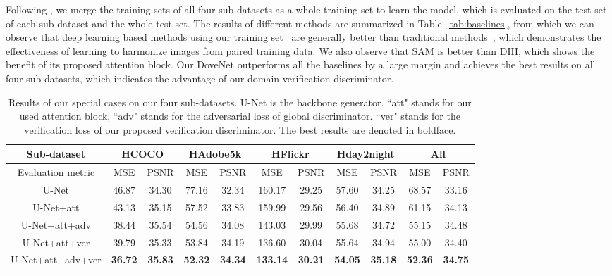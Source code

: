 \documentclass[10pt,twocolumn,letterpaper]{article}
\begin{document}
Following \cite{tsai2017deep}, we merge the training sets of all four sub-datasets as a whole training set to learn the model, which is evaluated on the test set of each sub-dataset and the whole test set. The results of different methods are summarized in Table~\ref{tab:baselines}, from which we can observe that deep learning based methods using our training set~\cite{tsai2017deep,xiaodong2019improving} are generally better than traditional methods~\cite{lalonde2007using,xue2012understanding}, which demonstrates the effectiveness of learning to harmonize images from paired training data. We also observe that SAM is better than DIH, which shows the benefit of its proposed attention block. Our DoveNet outperforms all the baselines by a large margin and achieves the best results on all four sub-datasets, which indicates the advantage of our domain verification discriminator.





\setlength{\tabcolsep}{5pt}
\begin{table*}[tb]
\centering
\begin{tabular}{|l|c|c|c|c|c|c|c|c|c|c|}
\hline
\multicolumn{1}{|c|}{Sub-dataset} & \multicolumn{2}{c|}{HCOCO} & \multicolumn{2}{c|}{HAdobe5k} & \multicolumn{2}{c|}{HFlickr} & \multicolumn{2}{c|}{Hday2night} & \multicolumn{2}{c|}{All}\\ \hline
\multicolumn{1}{|c|}{Evaluation metric} & MSE & PSNR & MSE & PSNR & MSE & PSNR & MSE & PSNR & MSE & PSNR \\ \hline
\multicolumn{1}{|c|}{U-Net} & 46.87 & 34.30 & 77.16 & 32.34 & 160.17 & 29.25 & 57.60 & 34.25 & 68.57 & 33.16 \\ \hline
\multicolumn{1}{|c|}{U-Net+att} & 43.13 & 35.15 & 57.52 & 33.83 & 159.99 & 29.56 & 56.40 & 34.89 & 61.15 & 34.13 \\ \hline
\multicolumn{1}{|c|}{U-Net+att+adv} & 38.44 & 35.54 & 54.56 & 34.08 & 143.03 & 29.99 & 55.68 & 34.72 & 55.15 & 34.48 \\ \hline
\multicolumn{1}{|c|}{U-Net+att+ver} & 39.79 & 35.33 & 53.84 & 34.19 & 136.60 & 30.04 & 55.64 & 34.94 & 55.00 & 34.40 \\ \hline
\multicolumn{1}{|c|}{U-Net+att+adv+ver} & \bf36.72 & \bf35.83 & \bf52.32 & \bf34.34 & \bf133.14 & \bf30.21 & \bf54.05 & \bf35.18 & \bf52.36 & \bf34.75 \\ \hline
\end{tabular}
\caption{Results of our special cases on our four sub-datasets. U-Net is the backbone generator. ``att" stands for our used attention block, ``adv" stands for the adversarial loss of global discriminator. ``ver" stands for the verification loss of our proposed verification discriminator. The best results are denoted in boldface.}
\label{tab:ablate_loss}
\end{table*}
\end{document}
